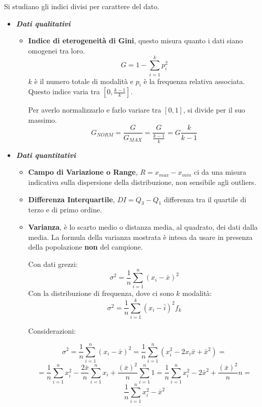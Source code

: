 \documentclass{article}
\begin{document}
      Si studiano gli indici divisi per carattere del dato. 
    \begin{itemize}
        \item\textit{\textbf{ Dati qualitativi}}
            \begin{itemize}
                \item \textbf{Indice di eterogeneità di Gini}, questo misura quanto i dati siano omogenei tra loro. 
                    $$G=1-\sum_{i=1}^{k}p_i^2$$ $k$ è il numero totale di modalità e $p_i$ è la frequenza relativa associata. Questo indice varia tra $[0,\frac{k-1}{k}]$. 
                    
                    Per averlo normalizzarlo e farlo variare tra $[0,1]$, si divide per il suo massimo. 
                        $$ G_{NORM}= \frac{G}{G_{MAX}}=\frac{G}{\frac{k-1}{k}}=G\frac{k}{k-1}$$
            \end{itemize}%
            
            
            
        \item\textbf{ \textit{Dati quantitativi}}
            \begin{itemize}
                \item \textbf{ Campo di Variazione o Range}, $R=x_{max}-x_{min}$ ci da una misura indicativa sulla dispersione della distribuzione, non sensibile agli outliers. 
                
                \item \textbf{Differenza Interquartile}, $DI=Q_3-Q_1$ differenza tra il quartile di terzo e di primo ordine.
                \newpage 
                \item\textbf{Varianza},  è lo scarto medio o distanza media, al quadrato, dei dati  dalla media. La formula della varianza mostrata è intesa da usare in presenza della popolazione \textbf{non} del campione.
                
                Con dati grezzi: 
                $$\sigma^2 = \frac{1}{n}\sum_{i=1}^{n}(x_i-\bar{x})^2$$
                Con la distribuzione di frequenza, dove ci sono $k$ modalità: 
                $$\sigma^2 =  \frac{1}{n}\sum_{i=1}^{k}(x_i-\bar{i})^2f_k$$
                
                Considerazioni: 
              
                   $$\sigma^2 = \frac{1}{n}\sum_{i=1}^{n}(x_i-\bar{x})^2= 
                   \frac{1}{n} \sum_{i=1}^{n}(x_i^2 -2x_i\bar{x} +\bar{x}^2)=$$
                   $$=\frac{1}{n}\sum_{i=1}^{n}x_i^2 -\frac{2\bar{x}}{n}\sum_{i=1}^{n}x_i + \frac{(\bar{x})^2}{n}\sum_{i=1}^{n}1=\frac{1}{n}\sum_{i=1}^{n}x_i^2 -2\bar{x}^2+ \frac{(\bar{x})^2}{n}n=$$
                   $$\frac{1}{n}\sum_{i=1}^{n}x_i^2-\bar{x}^2$$
                   

\end{itemize}
\end{itemize}
\end{document}
